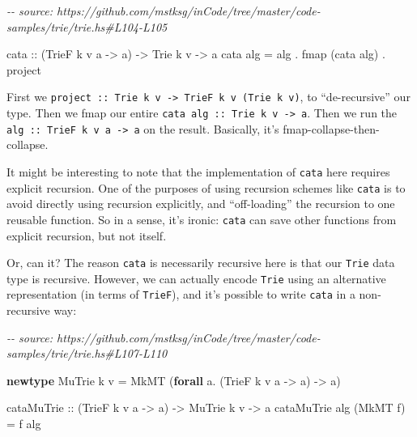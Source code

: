 \documentclass[]{article}
\newenvironment{Shaded}{}{}
\newcommand{\CommentTok}[1]{\textcolor[rgb]{0.38,0.63,0.69}{\textit{#1}}}
\newcommand{\DataTypeTok}[1]{\textcolor[rgb]{0.56,0.13,0.00}{#1}}
\newcommand{\FunctionTok}[1]{\textcolor[rgb]{0.02,0.16,0.49}{#1}}
\newcommand{\KeywordTok}[1]{\textcolor[rgb]{0.00,0.44,0.13}{\textbf{#1}}}
\newcommand{\NormalTok}[1]{#1}
\newcommand{\OperatorTok}[1]{\textcolor[rgb]{0.40,0.40,0.40}{#1}}
\newcommand{\OtherTok}[1]{\textcolor[rgb]{0.00,0.44,0.13}{#1}}
\begin{document}
\begin{Shaded}
\begin{Highlighting}[]
\CommentTok{{-}{-} source: https://github.com/mstksg/inCode/tree/master/code{-}samples/trie/trie.hs\#L104{-}L105}

\OtherTok{cata\textquotesingle{} ::}\NormalTok{ (}\DataTypeTok{TrieF}\NormalTok{ k v a }\OtherTok{{-}\textgreater{}}\NormalTok{ a) }\OtherTok{{-}\textgreater{}} \DataTypeTok{Trie}\NormalTok{ k v }\OtherTok{{-}\textgreater{}}\NormalTok{ a}
\NormalTok{cata\textquotesingle{} alg }\OtherTok{=}\NormalTok{ alg }\OperatorTok{.} \FunctionTok{fmap}\NormalTok{ (cata\textquotesingle{} alg) }\OperatorTok{.}\NormalTok{ project}
\end{Highlighting}
\end{Shaded}

First we
\texttt{project\ ::\ Trie\ k\ v\ -\textgreater{}\ TrieF\ k\ v\ (Trie\ k\ v)}, to
``de-recursive'' our type. Then we fmap our entire
\texttt{cata\ alg\ ::\ Trie\ k\ v\ -\textgreater{}\ a}. Then we run the
\texttt{alg\ ::\ TrieF\ k\ v\ a\ -\textgreater{}\ a} on the result. Basically,
it's fmap-collapse-then-collapse.

It might be interesting to note that the implementation of
\texttt{cata\textquotesingle{}} here requires explicit recursion. One of the
purposes of using recursion schemes like \texttt{cata} is to avoid directly
using recursion explicitly, and ``off-loading'' the recursion to one reusable
function. So in a sense, it's ironic: \texttt{cata} can save other functions
from explicit recursion, but not itself.

Or, can it? The reason \texttt{cata\textquotesingle{}} is necessarily recursive
here is that our \texttt{Trie} data type is recursive. However, we can actually
encode \texttt{Trie} using an alternative representation (in terms of
\texttt{TrieF}), and it's possible to write \texttt{cata\textquotesingle{}} in a
non-recursive way:

\begin{Shaded}
\begin{Highlighting}[]
\CommentTok{{-}{-} source: https://github.com/mstksg/inCode/tree/master/code{-}samples/trie/trie.hs\#L107{-}L110}

\KeywordTok{newtype} \DataTypeTok{MuTrie}\NormalTok{ k v }\OtherTok{=} \DataTypeTok{MkMT}\NormalTok{ (}\KeywordTok{forall}\NormalTok{ a}\OperatorTok{.}\NormalTok{ (}\DataTypeTok{TrieF}\NormalTok{ k v a }\OtherTok{{-}\textgreater{}}\NormalTok{ a) }\OtherTok{{-}\textgreater{}}\NormalTok{ a)}

\OtherTok{cataMuTrie ::}\NormalTok{ (}\DataTypeTok{TrieF}\NormalTok{ k v a }\OtherTok{{-}\textgreater{}}\NormalTok{ a) }\OtherTok{{-}\textgreater{}} \DataTypeTok{MuTrie}\NormalTok{ k v }\OtherTok{{-}\textgreater{}}\NormalTok{ a}
\NormalTok{cataMuTrie alg (}\DataTypeTok{MkMT}\NormalTok{ f) }\OtherTok{=}\NormalTok{ f alg}
\end{Highlighting}
\end{Shaded}
\end{document}
